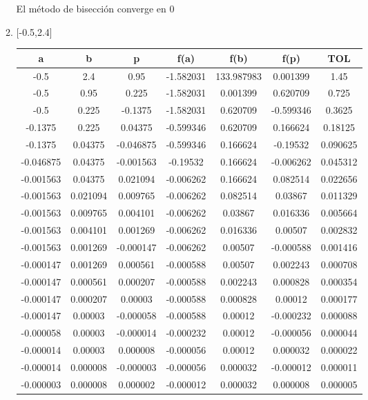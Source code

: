 \documentclass[12pt]{article}
\begin{document}
\begin{enumerate}
\begin{enumerate}[label=\alph*]
        El método de bisección converge en 0
        \item {[-0.5,2.4]}\\
        \begin{tabular}{|c|c|c|c|c|c|c|}
            \hline
            \textbf{a} & \textbf{b} & \textbf{p} & \textbf{f(a)} & \textbf{f(b)} & \textbf{f(p)} & \textbf{TOL}\\ \hline
            -0.5 & 2.4 & 0.95 & -1.582031 & 133.987983 & 0.001399 & 1.45 \\
            -0.5 & 0.95 & 0.225 & -1.582031 & 0.001399 & 0.620709 & 0.725 \\
            -0.5 & 0.225 & -0.1375 & -1.582031 & 0.620709 & -0.599346 & 0.3625 \\
            -0.1375 & 0.225 & 0.04375 & -0.599346 & 0.620709 & 0.166624 & 0.18125 \\
            -0.1375 & 0.04375 & -0.046875 & -0.599346 & 0.166624 & -0.19532 & 0.090625 \\
            -0.046875 & 0.04375 & -0.001563 & -0.19532 & 0.166624 & -0.006262 & 0.045312 \\
            -0.001563 & 0.04375 & 0.021094 & -0.006262 & 0.166624 & 0.082514 & 0.022656 \\
            -0.001563 & 0.021094 & 0.009765 & -0.006262 & 0.082514 & 0.03867 & 0.011329 \\
            -0.001563 & 0.009765 & 0.004101 & -0.006262 & 0.03867 & 0.016336 & 0.005664 \\
            -0.001563 & 0.004101 & 0.001269 & -0.006262 & 0.016336 & 0.00507 & 0.002832 \\
            -0.001563 & 0.001269 & -0.000147 & -0.006262 & 0.00507 & -0.000588 & 0.001416 \\
            -0.000147 & 0.001269 & 0.000561 & -0.000588 & 0.00507 & 0.002243 & 0.000708 \\
            -0.000147 & 0.000561 & 0.000207 & -0.000588 & 0.002243 & 0.000828 & 0.000354 \\
            -0.000147 & 0.000207 & 0.00003 & -0.000588 & 0.000828 & 0.00012 & 0.000177 \\
            -0.000147 & 0.00003 & -0.000058 & -0.000588 & 0.00012 & -0.000232 & 0.000088 \\
            -0.000058 & 0.00003 & -0.000014 & -0.000232 & 0.00012 & -0.000056 & 0.000044 \\
            -0.000014 & 0.00003 & 0.000008 & -0.000056 & 0.00012 & 0.000032 & 0.000022 \\
            -0.000014 & 0.000008 & -0.000003 & -0.000056 & 0.000032 & -0.000012 & 0.000011 \\
            -0.000003 & 0.000008 & 0.000002 & -0.000012 & 0.000032 & 0.000008 & 0.000005 \\
            \hline
        \end{tabular}
        


\end{enumerate}
\end{enumerate}
\end{document}
